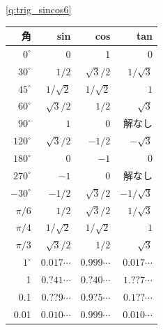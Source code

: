 \ref{q:trig_sincos6}　\\
\begin{tabular}{rrrr} \toprule
角         &  sin                      & cos                     & tan \\ \midrule
$0^{\circ}$   &   0                     &   1                      &   0 \\
$30^{\circ}$ & $1/2$                     & $\sqrt{3}/2$            & $1/\sqrt{3}$\\
$45^{\circ}$ & $1/\sqrt{2}$             &  $1/\sqrt{2}$            &  $1$\\
$60^{\circ}$ & $\sqrt{3}/2$             &  $1/2$                    &  $\sqrt{3}$\\
$90^{\circ}$ & $1$                       &  $0$                      &  解なし\\
$120^{\circ}$ & $\sqrt{3}/2$            &  $-1/2$                   &  $-\sqrt{3}$\\
$180^{\circ}$ & $0$                      &  $-1$                     &  $0$\\
$270^{\circ}$ & $-1$                    &  $0$                      & 解なし\\
$-30^{\circ}$ & $-1/2$                  &  $\sqrt{3}/2$            & $-1/\sqrt{3}$\\
$\pi/6$       & $1/2$                   &  $\sqrt{3}/2$            & $1/\sqrt{3}$\\
$\pi/4$       & $1/\sqrt{2}$            &  $1/\sqrt{2}$            & $1$\\
$\pi/3$       & $\sqrt{3}/2$             &  $1/2$                    &  $\sqrt{3}$\\
$1^{\circ}$  & $0.017\cdots$  & $0.999\cdots$ & $0.017\cdots$ \\ 
1            & $0.?41\cdots$  & $0.?40\cdots$ & $1.??7\cdots$ \\ 
0.1          & $0.??9\cdots$  & $0.9?5\cdots$ & $0.1??\cdots$ \\ 
0.01         & $0.010\cdots$  & $0.999\cdots$  & $0.010\cdots$ \\ \bottomrule
\end{tabular}\\
\mv


